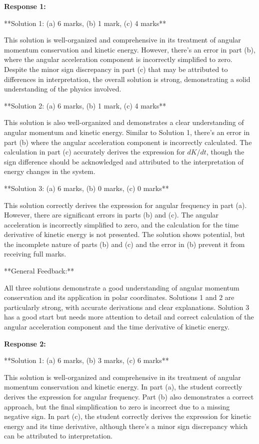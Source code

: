\documentclass[a4paper,11pt]{article}
\begin{document}
\textbf{Response 1:}

**Solution 1: (a) 6 marks, (b) 1 mark, (c) 4 marks**

This solution is well-organized and comprehensive in its treatment of angular momentum conservation and kinetic energy. However, there's an error in part (b), where the angular acceleration component is incorrectly simplified to zero. Despite the minor sign discrepancy in part (c) that may be attributed to differences in interpretation, the overall solution is strong, demonstrating a solid understanding of the physics involved.

**Solution 2: (a) 6 marks, (b) 1 mark, (c) 4 marks**

This solution is also well-organized and demonstrates a clear understanding of angular momentum and kinetic energy. Similar to Solution 1, there's an error in part (b) where the angular acceleration component is incorrectly calculated. The calculation in part (c) accurately derives the expression for \( dK/dt \), though the sign difference should be acknowledged and attributed to the interpretation of energy changes in the system.

**Solution 3: (a) 6 marks, (b) 0 marks, (c) 0 marks**

This solution correctly derives the expression for angular frequency in part (a). However, there are significant errors in parts (b) and (c). The angular acceleration is incorrectly simplified to zero, and the calculation for the time derivative of kinetic energy is not presented. The solution shows potential, but the incomplete nature of parts (b) and (c) and the error in (b) prevent it from receiving full marks.

**General Feedback:**

All three solutions demonstrate a good understanding of angular momentum conservation and its application in polar coordinates. Solutions 1 and 2 are particularly strong, with accurate derivations and clear explanations. Solution 3 has a good start but needs more attention to detail and correct calculation of the angular acceleration component and the time derivative of kinetic energy.

\bigskip    
\textbf{Response 2:}

**Solution 1: (a) 6 marks, (b) 3 marks, (c) 6 marks**

This solution is well-organized and comprehensive in its treatment of angular momentum conservation and kinetic energy. In part (a), the student correctly derives the expression for angular frequency. Part (b) also demonstrates a correct approach, but the final simplification to zero is incorrect due to a missing negative sign. In part (c), the student correctly derives the expression for kinetic energy and its time derivative, although there's a minor sign discrepancy which can be attributed to interpretation. 
\end{document}
